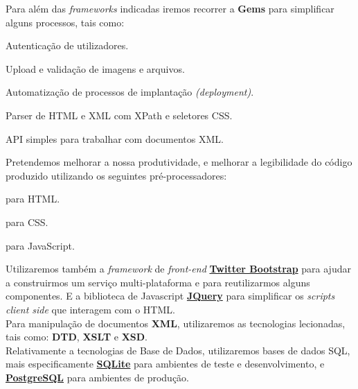 Para além das \textit{frameworks} indicadas iremos recorrer a \textbf{Gems} para simplificar alguns processos, tais como:

\begin{description}[labelindent=1cm]
  \item[Devise] Autenticação de utilizadores.
  \item[Paperclip] Upload e validação de imagens e arquivos.
  \item[Capistrano] Automatização de processos de implantação \textit{(deployment)}.
  \item[Nokogiri] Parser de HTML e XML com XPath e seletores CSS.
  \item[XML-Simple] API simples para trabalhar com documentos XML.
\end{description} 

Pretendemos melhorar a nossa produtividade, e melhorar a legibilidade do código produzido utilizando os seguintes pré-processadores:

\begin{description}[labelindent=1cm]
  \item[\href{http://slim-lang.com/}{Slim}] para HTML.
  \item[\href{http://sass-lang.com/}{SASS}] para CSS.
  \item[\href{http://coffeescript.org/}{CoffeeScript}] para JavaScript.
\end{description} 

Utilizaremos também a \textit{framework} de \textit{front-end} \href{http://getbootstrap.com/}{\textbf{Twitter Bootstrap}} para ajudar a construirmos um serviço multi-plataforma e para reutilizarmos alguns componentes. E a biblioteca de Javascript \href{http://jquery.com/}{\textbf{JQuery}} para simplificar os \textit{scripts client side} que interagem com o HTML.\\

Para manipulação de documentos \textbf{XML}, utilizaremos as tecnologias lecionadas, tais como: \textbf{DTD}, \textbf{XSLT} e \textbf{XSD}.\\

Relativamente a tecnologias de Base de Dados, utilizaremos bases de dados SQL, mais especificamente \href{http://www.sqlite.org/}{\textbf{SQLite}} para ambientes de teste e desenvolvimento, e \href{http://www.postgresql.org/}{\textbf{PostgreSQL}} para ambientes de produção.



